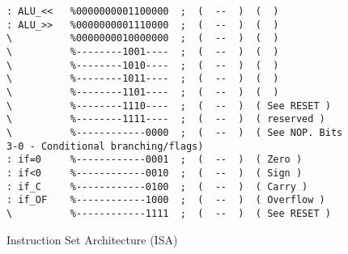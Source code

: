 \begin{figure*}[h!]
\begin{lstlisting}
: ALU_<<   %0000000001100000  ;  (  --  )  (  )
: ALU_>>   %0000000001110000  ;  (  --  )  (  )
\          %0000000010000000  ;  (  --  )  (  )
\          %--------1001----  ;  (  --  )  (  )
\          %--------1010----  ;  (  --  )  (  )
\          %--------1011----  ;  (  --  )  (  )
\          %--------1101----  ;  (  --  )  (  )
\          %--------1110----  ;  (  --  )  ( See RESET )
\          %--------1111----  ;  (  --  )  ( reserved )
\          %------------0000  ;  (  --  )  ( See NOP. Bits 3-0 - Conditional branching/flags)
: if=0     %------------0001  ;  (  --  )  ( Zero )
: if<0     %------------0010  ;  (  --  )  ( Sign )
: if_C     %------------0100  ;  (  --  )  ( Carry )
: if_OF    %------------1000  ;  (  --  )  ( Overflow )
\          %------------1111  ;  (  --  )  ( See RESET )              
\end{lstlisting}
\caption[Instruction Set Architecture]{Instruction Set Architecture (ISA)}
\end{figure*}


